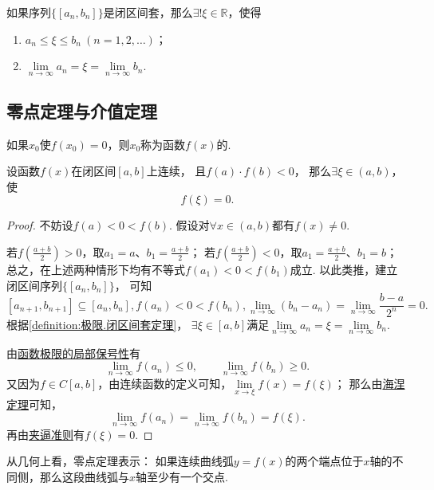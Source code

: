\begin{theorem}\label{definition:极限.闭区间套定理}
如果序列\(\{[a_n,b_n]\}\)是闭区间套，那么\(\exists!\xi\in\mathbb{R}\)，使得
\begin{enumerate}
\item \(a_n \leq \xi \leq b_n\ (n=1,2,\dotsc)\)；
\item \(\lim\limits_{n\to\infty} a_n
= \xi
= \lim\limits_{n\to\infty} b_n\).
\end{enumerate}
\end{theorem}

\subsection{零点定理与介值定理}
\begin{definition}
如果\(x_0\)使\(f(x_0) = 0\)，则\(x_0\)称为函数\(f(x)\)的.
\end{definition}

\begin{theorem}[零点定理]\label{theorem:极限.闭区间上连续函数的性质.零点定理}
设函数\(f(x)\)在闭区间\([a,b]\)上连续，
且\(f(a) \cdot f(b)<0\)，
那么\(\exists\xi\in(a,b)\)，使\[
	f(\xi) = 0.
\]
\begin{proof}
不妨设\(f(a) < 0 < f(b)\).
假设对\(\forall x\in(a,b)\)都有\(f(x) \neq 0\).

若\(f\left(\frac{a+b}{2}\right)>0\)，取\(a_1=a\)、\(b_1=\frac{a+b}{2}\)；
若\(f\left(\frac{a+b}{2}\right)<0\)，取\(a_1=\frac{a+b}{2}\)、\(b_1=b\)；
总之，在上述两种情形下均有不等式\(f(a_1) < 0 < f(b_1)\)成立.
以此类推，建立闭区间序列\(\{[a_n,b_n]\}\)，
可知\[
[a_{n+1},b_{n+1}] \subseteq [a_n,b_n],
f(a_n) < 0 < f(b_n),
\lim\limits_{n\to\infty} (b_n - a_n)
= \lim\limits_{n\to\infty} \frac{b-a}{2^n}
= 0.
\]
根据\cref{definition:极限.闭区间套定理}，
\(\exists\xi\in[a,b]\)满足\(\lim\limits_{n\to\infty} a_n
= \xi
= \lim\limits_{n\to\infty} b_n\).

由\hyperref[theorem:极限.函数极限的局部保号性3]{函数极限的局部保号性}有\[
\lim\limits_{n\to\infty} f(a_n) \leq 0,
\qquad
\lim\limits_{n\to\infty} f(b_n) \geq 0.
\]
又因为\(f \in C[a,b]\)，由连续函数的定义可知，\(\lim\limits_{x\to\xi} f(x) = f(\xi)\)；
那么由\hyperref[theorem:极限.海涅定理]{海涅定理}可知，\[
\lim\limits_{n\to\infty} f(a_n)
= \lim\limits_{n\to\infty} f(b_n)
= f(\xi).
\]再由\hyperref[theorem:极限.夹逼准则]{夹逼准则}有\(f(\xi)=0\).
\end{proof}
\end{theorem}
从几何上看，零点定理表示：
如果连续曲线弧\(y = f(x)\)的两个端点位于\(x\)轴的不同侧，那么这段曲线弧与\(x\)轴至少有一个交点.

